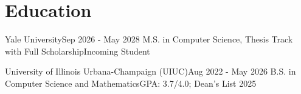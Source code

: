 \section{Education}
  \resumeSubHeadingListStart
    \resumeSubheadingCourse
    {Yale University}{Sep 2026 - May 2028}
    {M.S. in Computer Science, Thesis Track with Full Scholarship}{Incoming Student}

    \resumeSubheadingCourse
      {University of Illinois Urbana-Champaign (UIUC)}{Aug 2022 - May 2026}
      {B.S. in Computer Science and Mathematics}{GPA: 3.7/4.0; Dean's List 2025}
    \vspace{0.6pt}

  \resumeSubHeadingListEnd
  
